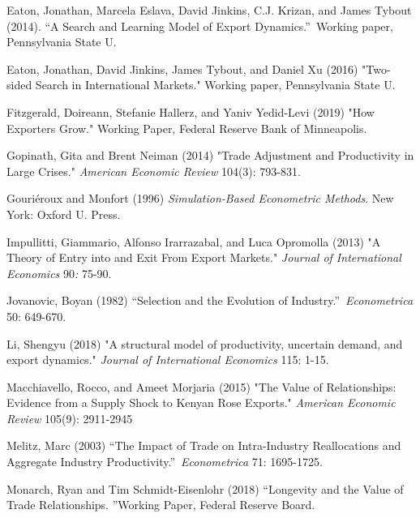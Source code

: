\documentclass[12pt]{article}
\begin{document}
\begin{description}
\item Eaton, Jonathan, Marcela Eslava, David Jinkins, C.J. Krizan, and James
Tybout (2014). \textquotedblleft A Search and Learning Model of Export
Dynamics.\textquotedblright\ Working paper, Pennsylvania State U.

\item Eaton, Jonathan, David Jinkins, James Tybout, and Daniel Xu (2016)
"Two-sided Search in International Markets." Working paper, Pennsylvania
State U.

\item Fitzgerald, Doireann, Stefanie Hallerz, and Yaniv Yedid-Levi (2019)
"How Exporters Grow." Working Paper, Federal Reserve Bank of Minneapolis.

\item Gopinath, Gita and Brent Neiman (2014) "Trade Adjustment and
Productivity in Large Crises." \textit{American Economic Review} 104(3):
793-831.

\item Gouri\'{e}roux and Monfort (1996) \textit{Simulation-Based Econometric
Methods}. New York: Oxford U. Press.

\item Impullitti, Giammario, Alfonso Irarrazabal, and Luca Opromolla (2013)
"A Theory of Entry into and Exit From Export Markets." \textit{Journal of
International Economics} 90\textit{: }75-90.

\item Jovanovic, Boyan (1982) \textquotedblleft Selection and the Evolution
of Industry.\textquotedblright\ \textit{Econometrica} 50: 649-670.

\item Li, Shengyu (2018) "A structural model of productivity, uncertain
demand, and export dynamics." \textit{Journal of International Economics}
115: 1-15.

\item Macchiavello, Rocco, and Ameet Morjaria (2015) "The Value of
Relationships: Evidence from a Supply Shock to Kenyan Rose Exports." \textit{%
American Economic Review} 105(9): 2911-2945

\item Melitz, Marc (2003) \textquotedblleft The Impact of Trade on
Intra-Industry Reallocations and Aggregate Industry
Productivity.\textquotedblright\ \textit{Econometrica }71: 1695-1725.

\item Monarch, Ryan and Tim Schmidt-Eisenlohr (2018) \textquotedblleft Longevity and the Value of Trade Relationships. \textquotedblright Working Paper, Federal Reserve Board.


\end{description}
\end{document}

